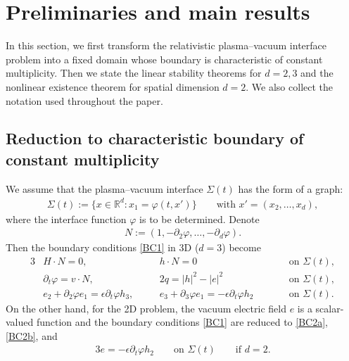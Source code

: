 \documentclass[twoside,11pt]{article}
\numberwithin{equation}{section}
\def\p{\partial}
\begin{document}
\vspace*{2mm}

	\section{Preliminaries and main results}\label{sec:main}
	
	In this section, we first transform the relativistic plasma--vacuum interface problem {into a fixed domain whose boundary is characteristic of constant multiplicity}.
	Then we state the linear stability theorems for $d=2,3$ and the nonlinear existence theorem for spatial dimension $d=2$. We also collect the notation used throughout the paper.
	
	\subsection{Reduction to characteristic boundary of constant multiplicity}
We assume that the plasma--vacuum interface $\Sigma(t)$ has the form of a graph:
\begin{align*}
	\Sigma(t):=\{x\in\mathbb{R}^d:x_1=\varphi(t,x')\} \qquad \textrm{with \ } x'=(x_2,\ldots,x_d),
\end{align*}
where the interface function $\varphi$ is to be determined.
Denote
\begin{align}
	N:=(1,-\p_2\varphi,\ldots,-\p_d\varphi).
	\label{N:def}
\end{align}
Then the boundary conditions \eqref{BC1} in 3D ($d=3$) become	
\begin{alignat}{3}
\label{BC2a}	
	&	H\cdot N=0,\quad  && h\cdot N=0\qquad &&
	\textrm{on }\Sigma(t),\\
\label{BC2b}		
&\p_t \varphi=v\cdot N,\quad &&2q=  |h|^2-|e|^2\qquad &&
\textrm{on }\Sigma(t),\\
	&
	e_2+\p_2 \varphi e_1=\epsilon \p_t \varphi h_3,\quad &&
e_3+\p_3 \varphi e_1=-\epsilon \p_t \varphi h_2
\qquad &&
\textrm{on }\Sigma(t).
\label{BC2c}	
\end{alignat}
On the other hand, for the 2D %
problem, the vacuum electric field $e$ is a scalar-valued function and the boundary conditions \eqref{BC1} are reduced to \eqref{BC2a}, \eqref{BC2b}, and
\begin{alignat}{3}
 e=-\epsilon \p_t \varphi h_2\qquad \textrm{on }\Sigma(t) \qquad \textrm{if }d=2.
\label{BC2d}		
\end{alignat}
\end{document}

